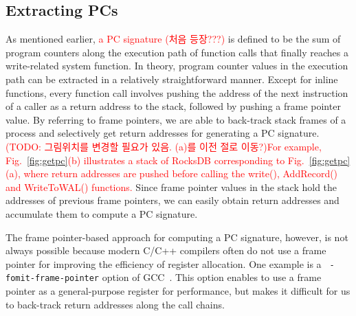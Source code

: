 \subsection{Extracting PCs}
As mentioned earlier, \textcolor{red}{a PC signature (처음 등장???)} is defined
to be the sum of program counters along the execution path of function calls
that finally reaches a write-related system function.  In theory, program
counter values in the execution path can be extracted in a relatively
straightforward manner.  Except for inline functions, every function call
involves pushing the address of the next instruction of a caller as a return
address to the stack, followed by pushing a frame pointer value.  By referring
to frame pointers, we are able to back-track stack frames of a process and
selectively get return addresses for generating a PC signature.
\textcolor{red}{(TODO: 그림위치를 변경할 필요가 있음. (a)를 이전 절로 이동?)For
example, Fig.~\ref{fig:getpc}(b) illustrates a stack of RocksDB corresponding
to Fig.~\ref{fig:getpc}(a), where return addresses are pushed before calling
the \textsf{\small  write()}, \textsf{\small AddRecord()} and \textsf{\small
WriteToWAL()} functions.}  Since frame pointer values in the stack hold the
addresses of previous frame pointers, we can easily obtain return addresses and
accumulate them to compute a PC signature.  


The frame pointer-based approach for computing a PC signature, however, is not
always possible because modern C/C++ compilers often do not use a frame pointer
for improving the efficiency of register allocation.  One example is a {\tt
-fomit-frame-pointer} option of GCC~\cite{GCC}.  This option enables to use a frame
pointer as a general-purpose register for performance, but makes it difficult for us
to back-track return addresses along the call chains.  

